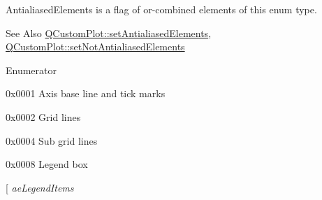 {\ttfamily Antialiased\-Elements} is a flag of or-\/combined elements of this enum type.

\begin{DoxySeeAlso}{See Also}
\hyperlink{class_q_custom_plot_af6f91e5eab1be85f67c556e98c3745e8}{Q\-Custom\-Plot\-::set\-Antialiased\-Elements}, \hyperlink{class_q_custom_plot_ae10d685b5eabea2999fb8775ca173c24}{Q\-Custom\-Plot\-::set\-Not\-Antialiased\-Elements} 
\end{DoxySeeAlso}
\begin{Desc}
\item[Enumerator]\par
\begin{description}
\item[{\em 
\hypertarget{namespace_q_c_p_ae55dbe315d41fe80f29ba88100843a0caefa92e89cd37f8a081fd2075aa1af73f}{ae\-Axes}\label{namespace_q_c_p_ae55dbe315d41fe80f29ba88100843a0caefa92e89cd37f8a081fd2075aa1af73f}
}]{\ttfamily 0x0001} Axis base line and tick marks \item[{\em 
\hypertarget{namespace_q_c_p_ae55dbe315d41fe80f29ba88100843a0ca4fbb37118d62288af0ca601ff2b07a2f}{ae\-Grid}\label{namespace_q_c_p_ae55dbe315d41fe80f29ba88100843a0ca4fbb37118d62288af0ca601ff2b07a2f}
}]{\ttfamily 0x0002} Grid lines \item[{\em 
\hypertarget{namespace_q_c_p_ae55dbe315d41fe80f29ba88100843a0caaedf83369188a15a69f92bb1d85ca97b}{ae\-Sub\-Grid}\label{namespace_q_c_p_ae55dbe315d41fe80f29ba88100843a0caaedf83369188a15a69f92bb1d85ca97b}
}]{\ttfamily 0x0004} Sub grid lines \item[{\em 
\hypertarget{namespace_q_c_p_ae55dbe315d41fe80f29ba88100843a0ca9e0127a6361b5d0596b031a482c5cf97}{ae\-Legend}\label{namespace_q_c_p_ae55dbe315d41fe80f29ba88100843a0ca9e0127a6361b5d0596b031a482c5cf97}
}]{\ttfamily 0x0008} Legend box \item[{\em 
\hypertarget{namespace_q_c_p_ae55dbe315d41fe80f29ba88100843a0ca1aca7a50c1b95403958733a4acafe773}{ae\-Legend\-Items}\label{namespace_q_c_p_ae55dbe315d41fe80f29ba88100843a0ca1aca7a50c1b95403958733a4acafe773}
}
\end{description}
\end{Desc}
